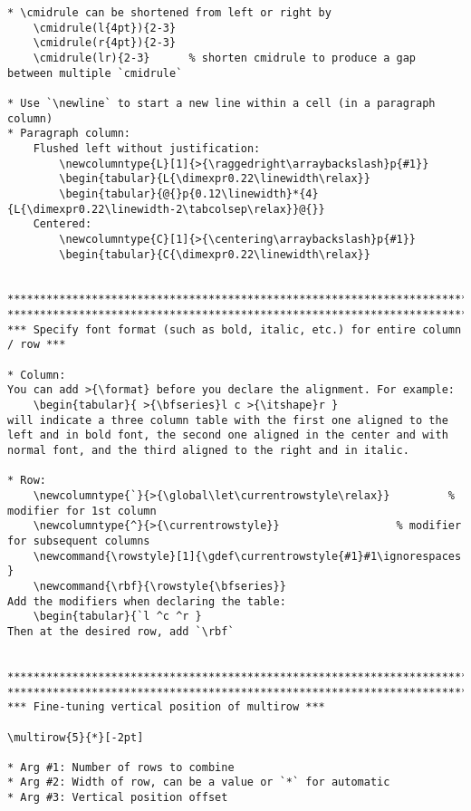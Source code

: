 \documentclass{article}
\newcommand{\rowstyle}[1]{\gdef\currentrowstyle{#1}#1\ignorespaces }
\newcommand{\rbf}{\rowstyle{\bfseries}}
\begin{document}
\begin{lstlisting}[language={[LaTeX]TeX}, caption={Alternative short names.}]
* \cmidrule can be shortened from left or right by
	\cmidrule(l{4pt}){2-3}
	\cmidrule(r{4pt}){2-3}
	\cmidrule(lr){2-3}		% shorten cmidrule to produce a gap between multiple `cmidrule`

* Use `\newline` to start a new line within a cell (in a paragraph column)
* Paragraph column:
	Flushed left without justification:
		\newcolumntype{L}[1]{>{\raggedright\arraybackslash}p{#1}}
		\begin{tabular}{L{\dimexpr0.22\linewidth\relax}}
		\begin{tabular}{@{}p{0.12\linewidth}*{4}{L{\dimexpr0.22\linewidth-2\tabcolsep\relax}}@{}}
	Centered:
		\newcolumntype{C}[1]{>{\centering\arraybackslash}p{#1}}
		\begin{tabular}{C{\dimexpr0.22\linewidth\relax}}


*********************************************************************************************
*********************************************************************************************
*** Specify font format (such as bold, italic, etc.) for entire column / row ***

* Column:
You can add >{\format} before you declare the alignment. For example:
	\begin{tabular}{ >{\bfseries}l c >{\itshape}r }
will indicate a three column table with the first one aligned to the left and in bold font, the second one aligned in the center and with normal font, and the third aligned to the right and in italic.

* Row:
	\newcolumntype{`}{>{\global\let\currentrowstyle\relax}}			% modifier for 1st column
	\newcolumntype{^}{>{\currentrowstyle}}					% modifier for subsequent columns
	\newcommand{\rowstyle}[1]{\gdef\currentrowstyle{#1}#1\ignorespaces }
	\newcommand{\rbf}{\rowstyle{\bfseries}}
Add the modifiers when declaring the table:
	\begin{tabular}{`l ^c ^r }
Then at the desired row, add `\rbf`


*********************************************************************************************
*********************************************************************************************
*** Fine-tuning vertical position of multirow ***

\multirow{5}{*}[-2pt]

* Arg #1: Number of rows to combine
* Arg #2: Width of row, can be a value or `*` for automatic
* Arg #3: Vertical position offset




\end{lstlisting}
\end{document}
